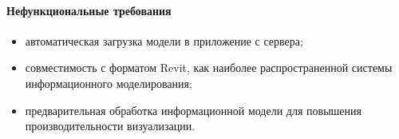 \paragraph{Нефункциональные требования}
\begin{itemize}
    \item автоматическая загрузка модели в приложение с сервера;
    \item совместимость с форматом Revit,
    как наиболее распространенной системы информационного моделирования;
    \item предварительная обработка информационной модели
    для повышения производительности визуализации.
\end{itemize}